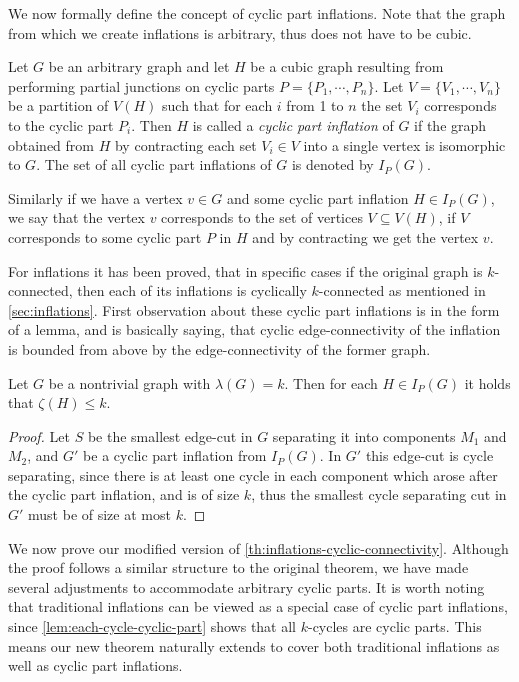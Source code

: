 \documentclass[12pt, twoside]{book}
\begin{document}
We now formally define the concept of cyclic part inflations. Note that the graph from which we create inflations is arbitrary, thus does not have to be cubic.

\begin{definition}
	\label{def:cyclic-part-inflation}
	Let $G$ be an arbitrary graph and let $H$ be a cubic graph resulting from performing partial junctions on cyclic parts $P=\{P_1,\cdots,P_n\}$. Let $V=\{V_1,\cdots, V_n\}$ be a partition of $V(H)$ such that for each $i$ from 1 to $n$ the set $V_i$ corresponds to the cyclic part $P_i$. Then $H$ is called a \textit{cyclic part inflation} of $G$ if the graph obtained from $H$ by contracting each set $V_i\in V$ into a single vertex is isomorphic to $G$. The set of all cyclic part inflations of $G$ is denoted by $I_P(G)$.
\end{definition}

Similarly if we have a vertex $v\in G$ and some cyclic part inflation $H\in I_P(G)$, we say that the vertex $v$ corresponds to the set of vertices $V\subseteq V(H)$, if $V$ corresponds to some cyclic part $P$ in $H$ and by contracting we get the vertex $v$.

For inflations it has been proved, that in specific cases if the original graph is $k$-connected, then each of its inflations is cyclically $k$-connected as mentioned in \cref{sec:inflations}. First observation about these cyclic part inflations is in the form of a lemma, and is basically saying, that cyclic edge-connectivity of the inflation is bounded from above by the edge-connectivity of the former graph.

\begin{lemma}
	Let $G$ be a nontrivial graph with $\lambda(G)=k$. Then for each $H\in I_P(G)$ it holds that $\zeta(H)\leq k$.
\end{lemma}

\begin{proof}
	Let $S$ be the smallest edge-cut in $G$ separating it into components $M_1$ and $M_2$, and $G'$ be a cyclic part inflation from $I_P(G)$. In $G'$ this edge-cut is cycle separating, since there is at least one cycle in each component which arose after the cyclic part inflation, and is of size $k$, thus the smallest cycle separating cut in $G'$ must be of size at most $k$.
\end{proof}

We now prove our modified version of \cref{th:inflations-cyclic-connectivity}. Although the proof follows a similar structure to the original theorem, we have made several adjustments to accommodate arbitrary cyclic parts. It is worth noting that traditional inflations can be viewed as a special case of cyclic part inflations, since \cref{lem:each-cycle-cyclic-part} shows that all $k$-cycles are cyclic parts. This means our new theorem naturally extends to cover both traditional inflations as well as cyclic part inflations.
\end{document}
